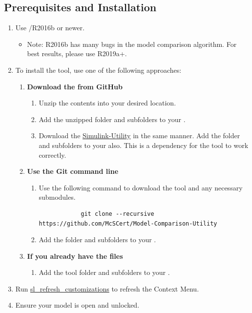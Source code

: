 \documentclass{article}
\begin{document}
\subsection{Prerequisites and Installation}

\begin{enumerate}
  \item Use \Matlab/\Simulink R2016b or newer.
		\begin{itemize}
			\item Note: R2016b has many bugs in the model comparison algorithm. For best results, please use R2019a+.
		\end{itemize}
	\item To install the tool, use one of the following approaches:
	\begin{enumerate}
		\item \textbf{Download the  from GitHub}
		\begin{enumerate} 
			\item Unzip the contents into your desired location. 
			\item Add the unzipped folder and subfolders to your \mpath. 
			\item Download the \href{https://github.com/McSCert/Simulink-Utility}{Simulink-Utility} in the same manner. Add the folder and subfolders to your \mpath also. This is a dependency for the tool to work correctly.
		\end{enumerate}
		\item \textbf{Use the Git command line}
		\begin{enumerate}
			\item Use the following command to download the tool and any necessary submodules. 
			\begin{verbatim}
			git clone --recursive https://github.com/McSCert/Model-Comparison-Utility
			\end{verbatim}
			\item Add the folder and subfolders to your \mpath. 
		\end{enumerate}
		\item \textbf{If you already have the files}
		\begin{enumerate}
			\item Add the tool folder and subfolders to your \mpath. 
		\end{enumerate}
	\end{enumerate}
	\item Run \href{https://www.mathworks.com/help/simulink/ug/registering-customizations.html}{sl\_refresh\_customizations} to refresh the Context Menu. 
	\item Ensure your model is open and unlocked.
\end{enumerate}
\end{document}
